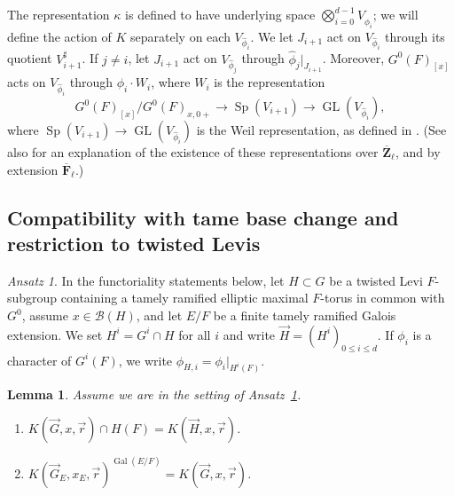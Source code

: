 \documentclass[reqno]{amsart}
\numberwithin{equation}{subsection}
\newcommand{\F}{\mathbf{F}}
\newcommand{\Z}{\mathbf{Z}}
\newcommand{\Gal}{\operatorname{Gal}}
\newcommand{\ol}[1]{\overline{#1}}
\newcommand\cB{\mathcal{B}}
\DeclareMathOperator{\GL}{GL}
\DeclareMathOperator{\Sp}{Sp}
\newtheorem{lemma}[thm]{Lemma}
\theoremstyle{remark}
\newtheorem{ansatz}[thm]{Ansatz}
\numberwithin{equation}{subsection}
\numberwithin{figure}{subsection}
\begin{document}
The representation $\kappa$ is defined to have underlying space $\bigotimes_{i=0}^{d-1} V_{\widehat{\phi}_i}$; we will define the action of $K$ separately on each $V_{\widehat{\phi}_i}$. We let $J_{i+1}$ act on $V_{\widehat{\phi}_i}$ through its quotient $V_{i+1}^\sharp$. If $j \neq i$, let $J_{i+1}$ act on $V_{\widehat{\phi}_j}$ through $\widehat{\phi}_j|_{J_{i+1}}$. Moreover, $G^0(F)_{[x]}$ acts on $V_{\widehat{\phi}_i}$ through $\phi_i \cdot W_i$, where $W_i$ is the representation
\[
G^0(F)_{[x]}/G^0(F)_{x,0+} \to \Sp(V_{i+1}) \to \GL(V_{\widehat{\phi}_i}),
\]
where $\Sp(V_{i+1}) \to \GL(V_{\widehat{\phi}_i})$ is the Weil representation, as defined in \cite[Theorem 2.4]{Ger77}. (See also \cite[Lemma 2.5]{Fin22} for an explanation of the existence of these representations over $\ol\Z_\ell$, and by extension $\ol\F_\ell$.)

\subsection{Compatibility with tame base change and restriction to twisted Levis}

\begin{ansatz}\label{ansatz:yu-functoriality-setup}
In the functoriality statements below, let $H \subset G$ be a twisted Levi $F$-subgroup containing a tamely ramified elliptic maximal $F$-torus in common with $G^0$, assume $x \in \cB(H)$, and let $E/F$ be a finite tamely ramified Galois extension. We set $H^i = G^i \cap H$ for all $i$ and write $\vec H = (H^i)_{0 \leq i \leq d}$. If $\phi_i$ is a character of $G^i(F)$, we write $\phi_{H,i} = \phi_i|_{H^i(F)}$.
\end{ansatz}

\begin{lemma}\label{lemma:yu-subgroup-fixed}
Assume we are in the setting of Ansatz~\ref{ansatz:yu-functoriality-setup}.
\begin{enumerate}
    \item $K({\vec{G}},x,\vec{r}) \cap H(F) = K(\vec{H},x,\vec{r})$.
    \item $K(\vec{G}_E, x_E, \vec{r})^{\Gal(E/F)} = K(\vec{G}, x, \vec{r})$.
\end{enumerate}
\end{lemma}
\end{document}
